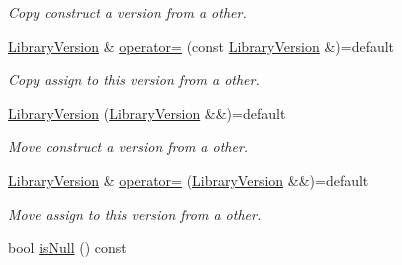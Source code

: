 \begin{DoxyCompactItemize}
\begin{DoxyCompactList}\small\item\em Copy construct a version from a other. \end{DoxyCompactList}\item 
\hyperlink{class_mdt_1_1_deploy_utils_1_1_library_version}{Library\+Version} \& \hyperlink{class_mdt_1_1_deploy_utils_1_1_library_version_a94b675ac2b9536b17b6589cf022fb7d1}{operator=} (const \hyperlink{class_mdt_1_1_deploy_utils_1_1_library_version}{Library\+Version} \&)=default\hypertarget{class_mdt_1_1_deploy_utils_1_1_library_version_a94b675ac2b9536b17b6589cf022fb7d1}{}\label{class_mdt_1_1_deploy_utils_1_1_library_version_a94b675ac2b9536b17b6589cf022fb7d1}

\begin{DoxyCompactList}\small\item\em Copy assign to this version from a other. \end{DoxyCompactList}\item 
\hyperlink{class_mdt_1_1_deploy_utils_1_1_library_version_ac7a782eb42a7da0506c7d1a37f659b46}{Library\+Version} (\hyperlink{class_mdt_1_1_deploy_utils_1_1_library_version}{Library\+Version} \&\&)=default\hypertarget{class_mdt_1_1_deploy_utils_1_1_library_version_ac7a782eb42a7da0506c7d1a37f659b46}{}\label{class_mdt_1_1_deploy_utils_1_1_library_version_ac7a782eb42a7da0506c7d1a37f659b46}

\begin{DoxyCompactList}\small\item\em Move construct a version from a other. \end{DoxyCompactList}\item 
\hyperlink{class_mdt_1_1_deploy_utils_1_1_library_version}{Library\+Version} \& \hyperlink{class_mdt_1_1_deploy_utils_1_1_library_version_a225f6ffcbb1069fbc2d9d29327903568}{operator=} (\hyperlink{class_mdt_1_1_deploy_utils_1_1_library_version}{Library\+Version} \&\&)=default\hypertarget{class_mdt_1_1_deploy_utils_1_1_library_version_a225f6ffcbb1069fbc2d9d29327903568}{}\label{class_mdt_1_1_deploy_utils_1_1_library_version_a225f6ffcbb1069fbc2d9d29327903568}

\begin{DoxyCompactList}\small\item\em Move assign to this version from a other. \end{DoxyCompactList}\item 
bool \hyperlink{class_mdt_1_1_deploy_utils_1_1_library_version_a7e4ee196a0e36a20e968f169aeeb0a3f}{is\+Null} () const \hypertarget{class_mdt_1_1_deploy_utils_1_1_library_version_a7e4ee196a0e36a20e968f169aeeb0a3f}{}\label{class_mdt_1_1_deploy_utils_1_1_library_version_a7e4ee196a0e36a20e968f169aeeb0a3f}


\end{DoxyCompactItemize}
